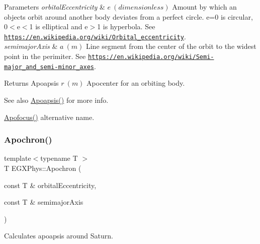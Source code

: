 \begin{DoxyParams}{Parameters}
{\em orbital\+Eccentricity} & $ e\ (dimensionless)$ Amount by which an objects orbit around another body deviates from a perfect circle. e=0 is circular, 0$<$e$<$1 is elliptical and e$>$1 is hyperbola. See \href{https://en.wikipedia.org/wiki/Orbital_eccentricity}{\tt https\+://en.\+wikipedia.\+org/wiki/\+Orbital\+\_\+eccentricity}. \\
\hline
{\em semimajor\+Axis} & $ a\ (m)$ Line segment from the center of the orbit to the widest point in the perimiter. See \href{https://en.wikipedia.org/wiki/Semi-major_and_semi-minor_axes}{\tt https\+://en.\+wikipedia.\+org/wiki/\+Semi-\/major\+\_\+and\+\_\+semi-\/minor\+\_\+axes}. \\
\hline
\end{DoxyParams}
\begin{DoxyReturn}{Returns}
Apoapsis $ r\ (m)$ Apocenter for an orbiting body. 
\end{DoxyReturn}
\begin{DoxySeeAlso}{See also}
\mbox{\hyperlink{group___e_g_x_phys-_apoapsis_gaf962e650bf84a568458e8eb39b1c61ba}{Apoapsis()}} for more info. 

\mbox{\hyperlink{group___e_g_x_phys-_apoapsis_gaa53ac4e15bc6bc0fecf72eadb7a513e0}{Apofocus()}} alternative name. 
\end{DoxySeeAlso}
\mbox{\label{group___e_g_x_phys-_apoapsis_gae4ea146039e6f32022321f0998e715e8}} 
\subsubsection{\texorpdfstring{Apochron()}{Apochron()}}
{\footnotesize\ttfamily template$<$typename T $>$ \\
T E\+G\+X\+Phys\+::\+Apochron (\begin{DoxyParamCaption}\item[{const T \&}]{orbital\+Eccentricity,  }\item[{const T \&}]{semimajor\+Axis }\end{DoxyParamCaption})}



Calculates apoapsis around Saturn. 


